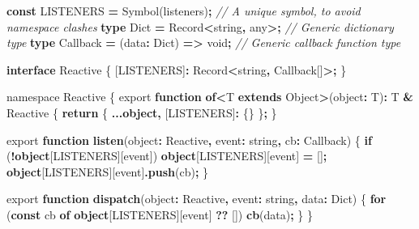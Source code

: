 \documentclass[
]{book}
\newenvironment{Shaded}{\begin{snugshade}}{\end{snugshade}}
\newcommand{\BuiltInTok}[1]{#1}
\newcommand{\CommentTok}[1]{\textcolor[rgb]{0.56,0.35,0.01}{\textit{#1}}}
\newcommand{\ControlFlowTok}[1]{\textcolor[rgb]{0.13,0.29,0.53}{\textbf{#1}}}
\newcommand{\DataTypeTok}[1]{\textcolor[rgb]{0.13,0.29,0.53}{#1}}
\newcommand{\FunctionTok}[1]{\textcolor[rgb]{0.13,0.29,0.53}{\textbf{#1}}}
\newcommand{\ImportTok}[1]{#1}
\newcommand{\KeywordTok}[1]{\textcolor[rgb]{0.13,0.29,0.53}{\textbf{#1}}}
\newcommand{\NormalTok}[1]{#1}
\newcommand{\OperatorTok}[1]{\textcolor[rgb]{0.81,0.36,0.00}{\textbf{#1}}}
\newcommand{\VerbatimStringTok}[1]{\textcolor[rgb]{0.31,0.60,0.02}{#1}}
\theoremstyle{definition}
\theoremstyle{definition}
\theoremstyle{definition}
\theoremstyle{definition}
\theoremstyle{remark}
\begin{document}
\begin{Shaded}
\begin{Highlighting}[]

\KeywordTok{const}\NormalTok{ LISTENERS }\OperatorTok{=} \BuiltInTok{Symbol}\NormalTok{(}\VerbatimStringTok{\textasciigrave{}listeners\textasciigrave{}}\NormalTok{)}\OperatorTok{;} \CommentTok{// A unique symbol, to avoid namespace clashes}
\KeywordTok{type}\NormalTok{ Dict }\OperatorTok{=} \BuiltInTok{Record}\OperatorTok{\textless{}}\DataTypeTok{string}\OperatorTok{,} \DataTypeTok{any}\OperatorTok{\textgreater{};} \CommentTok{// Generic dictionary type}
\KeywordTok{type}\NormalTok{ Callback }\OperatorTok{=}\NormalTok{ (data}\OperatorTok{:}\NormalTok{ Dict) }\KeywordTok{=\textgreater{}} \DataTypeTok{void}\OperatorTok{;} \CommentTok{// Generic callback function type}

\KeywordTok{interface}\NormalTok{ Reactive \{}
\NormalTok{  [LISTENERS]}\OperatorTok{:} \BuiltInTok{Record}\OperatorTok{\textless{}}\DataTypeTok{string}\OperatorTok{,}\NormalTok{ Callback[]}\OperatorTok{\textgreater{};}
\NormalTok{\}}

\ImportTok{namespace} \DataTypeTok{Reactive}\NormalTok{ \{}
  \ImportTok{export} \KeywordTok{function} \KeywordTok{of}\OperatorTok{\textless{}}\NormalTok{T }\KeywordTok{extends} \BuiltInTok{Object}\OperatorTok{\textgreater{}}\NormalTok{(object}\OperatorTok{:}\NormalTok{ T)}\OperatorTok{:}\NormalTok{ T }\OperatorTok{\&}\NormalTok{ Reactive \{}
    \ControlFlowTok{return}\NormalTok{ \{ }\OperatorTok{...}\KeywordTok{object}\OperatorTok{,}\NormalTok{ [LISTENERS]}\OperatorTok{:}\NormalTok{ \{\} \}}\OperatorTok{;}
\NormalTok{  \}}

  \ImportTok{export} \KeywordTok{function} \FunctionTok{listen}\NormalTok{(object}\OperatorTok{:}\NormalTok{ Reactive}\OperatorTok{,}\NormalTok{ event}\OperatorTok{:} \DataTypeTok{string}\OperatorTok{,}\NormalTok{ cb}\OperatorTok{:}\NormalTok{ Callback) \{}
    \ControlFlowTok{if}\NormalTok{ (}\OperatorTok{!}\KeywordTok{object}\NormalTok{[LISTENERS][}\BuiltInTok{event}\NormalTok{]) }\KeywordTok{object}\NormalTok{[LISTENERS][}\BuiltInTok{event}\NormalTok{] }\OperatorTok{=}\NormalTok{ []}\OperatorTok{;}
    \KeywordTok{object}\NormalTok{[LISTENERS][}\BuiltInTok{event}\NormalTok{]}\OperatorTok{.}\FunctionTok{push}\NormalTok{(cb)}\OperatorTok{;}
\NormalTok{  \}}

  \ImportTok{export} \KeywordTok{function} \FunctionTok{dispatch}\NormalTok{(object}\OperatorTok{:}\NormalTok{ Reactive}\OperatorTok{,}\NormalTok{ event}\OperatorTok{:} \DataTypeTok{string}\OperatorTok{,}\NormalTok{ data}\OperatorTok{:}\NormalTok{ Dict) \{}
    \ControlFlowTok{for}\NormalTok{ (}\KeywordTok{const}\NormalTok{ cb }\KeywordTok{of} \KeywordTok{object}\NormalTok{[LISTENERS][}\BuiltInTok{event}\NormalTok{] }\OperatorTok{??}\NormalTok{ []) }\FunctionTok{cb}\NormalTok{(data)}\OperatorTok{;}
\NormalTok{  \}}
\NormalTok{\}}


\end{Highlighting}
\end{Shaded}
\end{document}
